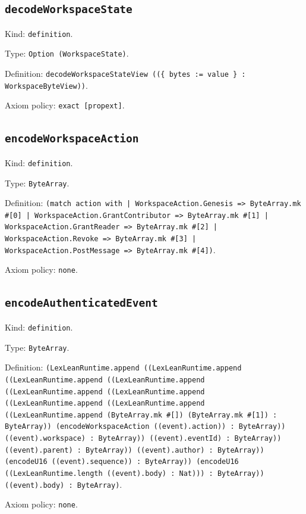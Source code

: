 \documentclass[11pt]{article}
\begin{document}
\subsection*{\texttt{decodeWorkspaceState}}
\noindent Kind: \texttt{definition}.\par
\noindent Type: \texttt{Option (WorkspaceState)}.\par
\noindent Definition: \texttt{decodeWorkspaceStateView ((\{ bytes := value \} : WorkspaceByteView))}.\par
\noindent Axiom policy: \texttt{exact [propext]}.\par
\subsection*{\texttt{encodeWorkspaceAction}}
\noindent Kind: \texttt{definition}.\par
\noindent Type: \texttt{ByteArray}.\par
\noindent Definition: \texttt{(match action with | WorkspaceAction.Genesis => ByteArray.mk \#[0] | WorkspaceAction.GrantContributor => ByteArray.mk \#[1] | WorkspaceAction.GrantReader => ByteArray.mk \#[2] | WorkspaceAction.Revoke => ByteArray.mk \#[3] | WorkspaceAction.PostMessage => ByteArray.mk \#[4])}.\par
\noindent Axiom policy: \texttt{none}.\par
\subsection*{\texttt{encodeAuthenticatedEvent}}
\noindent Kind: \texttt{definition}.\par
\noindent Type: \texttt{ByteArray}.\par
\noindent Definition: \texttt{(LexLeanRuntime.append ((LexLeanRuntime.append ((LexLeanRuntime.append ((LexLeanRuntime.append ((LexLeanRuntime.append ((LexLeanRuntime.append ((LexLeanRuntime.append ((LexLeanRuntime.append ((LexLeanRuntime.append (ByteArray.mk \#[]) (ByteArray.mk \#[1]) : ByteArray)) (encodeWorkspaceAction ((event).action)) : ByteArray)) ((event).workspace) : ByteArray)) ((event).eventId) : ByteArray)) ((event).parent) : ByteArray)) ((event).author) : ByteArray)) (encodeU16 ((event).sequence)) : ByteArray)) (encodeU16 ((LexLeanRuntime.length ((event).body) : Nat))) : ByteArray)) ((event).body) : ByteArray)}.\par
\noindent Axiom policy: \texttt{none}.\par
\end{document}
